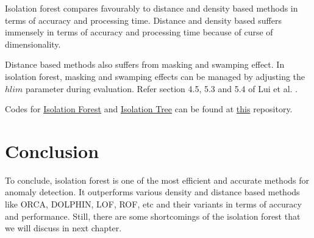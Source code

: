 Isolation forest compares favourably to distance and density  based methods in terms of accuracy and processing time.
Distance and density based suffers immensely in terms of accuracy and processing time because of curse of dimensionality.


Distance based methods also suffers from masking and swamping effect. 
In isolation forest, masking and swamping effects can be managed by adjusting the $hlim$ parameter during evaluation.
Refer section 4.5, 5.3 and 5.4 of Lui et al. \cite{10.1145/2133360.2133363}.


Codes for \href{https://github.com/KishoreKaushal/AnomalyDetection/blob/master/isolationforest/IsolationForest.py}{Isolation Forest} and \href{https://github.com/KishoreKaushal/AnomalyDetection/blob/master/isolationforest/IsolationTree.py}{Isolation Tree} can be found at \href{https://github.com/KishoreKaushal/AnomalyDetection}{this} repository.


\section{Conclusion}
\label{sec:iforest-conclusion}

To conclude, isolation forest is one of the most efficient and accurate methods for anomaly detection.
It outperforms various density and distance based methods like ORCA, DOLPHIN, LOF, ROF, etc and their variants in terms of accuracy and performance.
Still, there are some shortcomings of the isolation forest that we will discuss in next chapter.

